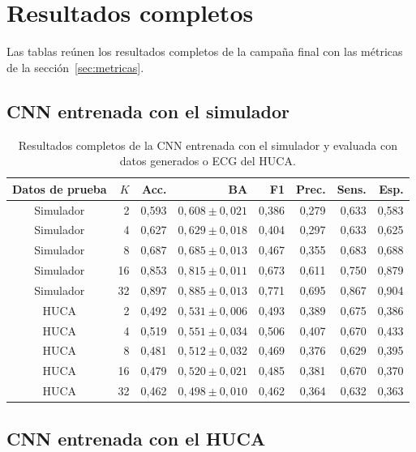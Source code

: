 \chapter{Resultados completos}
\label{app:resultados}

Las tablas reúnen los resultados completos de la campaña final con las métricas de la sección~\ref{sec:metricas}.

\section{CNN entrenada con el simulador}

\begin{table}[H]
  \centering
  \small
  \begin{tabular}{crrrrrrr}
    \toprule
    Datos de prueba & \(K\) & Acc. & BA & F1 & Prec. & Sens. & Esp. \\
    \midrule
    Simulador & 2  & 0,593 & \(0,608 \pm 0,021\) & 0,386 & 0,279 & 0,633 & 0,583 \\
    Simulador & 4  & 0,627 & \(0,629 \pm 0,018\) & 0,404 & 0,297 & 0,633 & 0,625 \\
    Simulador & 8  & 0,687 & \(0,685 \pm 0,013\) & 0,467 & 0,355 & 0,683 & 0,688 \\
    Simulador & 16 & 0,853 & \(0,815 \pm 0,011\) & 0,673 & 0,611 & 0,750 & 0,879 \\
    Simulador & 32 & 0,897 & \(0,885 \pm 0,013\) & 0,771 & 0,695 & 0,867 & 0,904 \\
    \midrule
    HUCA & 2  & 0,492 & \(0,531 \pm 0,006\) & 0,493 & 0,389 & 0,675 & 0,386 \\
    HUCA & 4  & 0,519 & \(0,551 \pm 0,034\) & 0,506 & 0,407 & 0,670 & 0,433 \\
    HUCA & 8  & 0,481 & \(0,512 \pm 0,032\) & 0,469 & 0,376 & 0,629 & 0,395 \\
    HUCA & 16 & 0,479 & \(0,520 \pm 0,021\) & 0,485 & 0,381 & 0,670 & 0,370 \\
    HUCA & 32 & 0,462 & \(0,498 \pm 0,010\) & 0,462 & 0,364 & 0,632 & 0,363 \\
    \bottomrule
  \end{tabular}
  \caption{Resultados completos de la CNN entrenada con el simulador y evaluada con datos generados o ECG del HUCA.}
  \label{tab:app_cnn_completo}
  \resultstablenote
\end{table}

\section{CNN entrenada con el HUCA}

